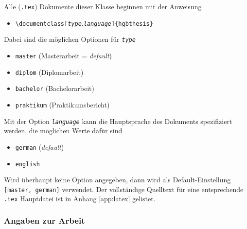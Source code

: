 Alle (\verb!.tex!) Dokumente dieser Klasse beginnen mit der Anweisung
%
\begin{itemize}
\item[] \verb!\documentclass[!\texttt{\emph{type}},\texttt{\emph{language}}\verb!]{hgbthesis}! 
\end{itemize}
%
Dabei sind die möglichen Optionen für \texttt{\emph{type}} 
%
\begin{itemize}
\item[] \verb!master! (Masterarbeit = \emph{default})
\item[] \verb!diplom! (Diplomarbeit)
\item[] \verb!bachelor! (Bachelorarbeit)
\item[] \verb!praktikum! (Praktikumsbericht)
\end{itemize}
%
Mit der Option \texttt{\emph{language}} kann die Hauptsprache des Dokuments spezifiziert werden, 
die möglichen Werte dafür sind
%
\begin{itemize}
\item[] \verb!german! (\emph{default})
\item[] \verb!english!
\end{itemize}
%
Wird überhaupt keine Option angegeben, dann wird als Default-Einstellung 
\texttt{[master, german]}
verwendet.
Der vollständige Quelltext für eine entsprechende \verb!.tex! Hauptdatei ist in Anhang \ref{app:latex} 
gelistet.


\subsubsection{Angaben zur Arbeit}

